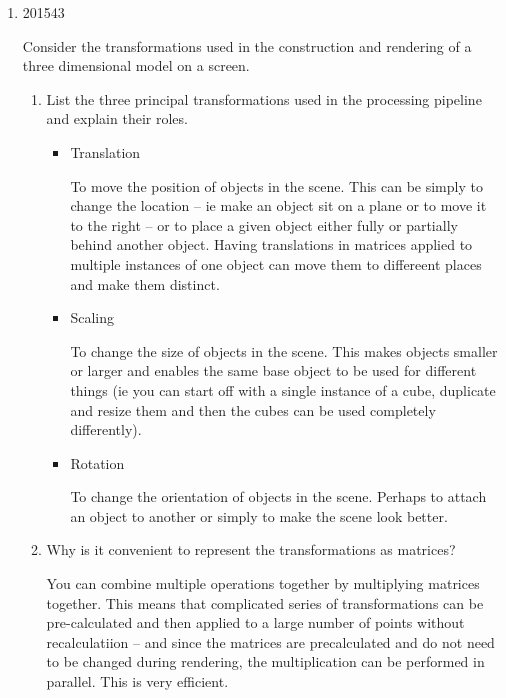\documentclass[10pt,\jkfside,a4paper]{article}
\begin{document}
\begin{enumerate}[label=(\alph*)]

\item 

\begin{examquestion}{2015}{4}{3}

Consider the transformations used in the construction and rendering of a three 
dimensional model on a screen.

\begin{enumerate}[label=(\alph*)]

\item List the three principal transformations used in the processing pipeline and 
explain their roles.

\begin{itemize}

\item Translation

To move the position of objects in the scene. This can be simply to change the location -- ie make 
an object sit on a plane or to move it to the right -- or to place a given object either fully or 
partially behind another object. Having translations in matrices applied to multiple instances of one 
object can move them to differeent places and make them distinct.

\item Scaling

To change the size of objects in the scene. This makes objects smaller or larger and enables the 
same base object to be used for different things (ie you can start off with a single instance of a 
cube, duplicate and resize them and then the cubes can be used completely differently).

\item Rotation

To change the orientation of objects in the scene. Perhaps to attach an object to another or simply to 
make the scene look better.

\end{itemize}

\item Why is it convenient to represent the transformations as matrices?

You can combine multiple operations together by multiplying matrices together. 
This means that complicated series of transformations can be pre-calculated 
and then applied to a large number of points without recalculatiion 
-- and since the matrices are precalculated and do not need to be changed during 
rendering, the multiplication can be performed in parallel. This is very efficient.


\end{enumerate}
\end{examquestion}
\end{enumerate}
\end{document}
